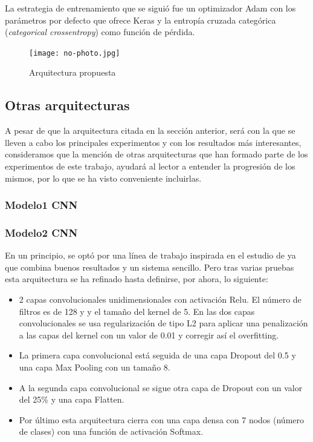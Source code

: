 \documentclass[11pt,a4paper,spanish]{book}
\begin{document}
		La estrategia de entrenamiento que se siguió fue un optimizador Adam con los parámetros por defecto que ofrece Keras y la entropía cruzada categórica (\emph{categorical crossentropy}) como función de pérdida.
		
		\begin{figure}[H]
			\centering
			\texttt{[image: no-photo.jpg]} 
			\caption{Arquitectura propuesta}
			\label{fig:lstm-cnn}
		\end{figure}
	
	
	\subsection{Otras arquitecturas}
	A pesar de que la arquitectura citada en la sección anterior, será con la que se lleven a cabo los principales experimentos y con los resultados más interesantes, consideramos que la mención de otras arquitecturas que han formado parte de los experimentos de este trabajo, ayudará al lector a entender la progresión de los mismos, por lo que se ha visto conveniente incluirlas.
	
		\subsubsection{Modelo1 CNN}
		\label{cap4:Modelo1}
	
		\subsubsection{Modelo2 CNN}
		\label{cap4:Modelo2}
		En un principio, se optó por una línea de trabajo inspirada en el estudio de \cite{AbdulQayyum2019} ya que combina buenos resultados y un sistema sencillo. Pero tras varias pruebas esta arquitectura se ha refinado hasta definirse, por ahora, lo siguiente:
		
		\begin{itemize}
			\item 2 capas convolucionales unidimensionales con activación Relu. El número de filtros es de 128 y  y el tamaño del kernel de 5.
			En las dos capas convolucionales se usa regularización de tipo L2 para aplicar una penalización a las capas del kernel con un valor de 0.01 y corregir así el overfitting.
			
			\item La primera capa convolucional está seguida de una capa Dropout del 0.5 y una capa Max Pooling con un tamaño 8.
			
			\item A la segunda capa convolucional se sigue otra capa de Dropout con un valor del 25\% y una capa Flatten.
			
			\item Por último esta arquitectura cierra con una capa densa con 7 nodos (número de clases) con una función de activación Softmax.
		\end{itemize}
	
\end{document}
